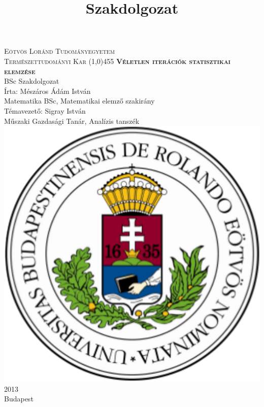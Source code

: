 \documentclass[a4paper,12pt]{report}
\title{Szakdolgozat}
\newcommand{\noun}[1]{\textsc{#1}}
\newcommand{\blankpage}{
	\newpage
	\setcounter{page}{1}
	\thispagestyle{empty}
	\mbox{}
	\newpage
}
\begin{document}



	\thispagestyle{empty}
	\begin{center}
		{\large \noun{Eötvös Loránd Tudományegyetem \\ Természettudományi Kar} }
		\line(1,0){455}
		\vspace{80pt}
		{\Huge \noun{\textbf{Véletlen iterációk statisztikai elemzése}}}
		\vspace{20pt}
		\\BSc Szakdolgozat
		\vspace{90pt}
		\\Írta: Mészáros Ádám István\\ Matematika BSc, Matematikai elemző szakirány\\
		\vspace{35pt}
		Témavezető: Sigray István\\ Műszaki Gazdasági Tanár, Analízis tanszék\\
		\vspace{80pt}
		\includegraphics[scale=0.21]{elte.png}
		\vspace{25pt}
		\\ 2013\\ Budapest
	\end{center}
	\blankpage
	\tableofcontents
\end{document}
